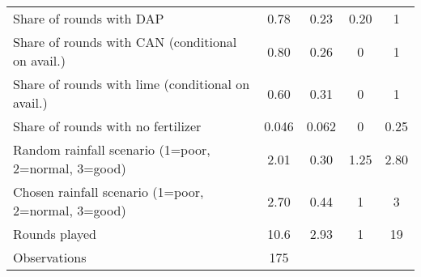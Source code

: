 \begin{table}[htbp]
\begin{threeparttable}
\begin{tabular}{l cccc}
Share of rounds with DAP&        0.78&        0.23&        0.20&           1\\
Share of rounds with CAN (conditional on avail.)&        0.80&        0.26&           0&           1\\
Share of rounds with lime (conditional on avail.)&        0.60&        0.31&           0&           1\\
Share of rounds with no fertilizer&       0.046&       0.062&           0&        0.25\\
Random rainfall scenario (1=poor, 2=normal, 3=good)&        2.01&        0.30&        1.25&        2.80\\
Chosen rainfall scenario (1=poor, 2=normal, 3=good)&        2.70&        0.44&           1&           3\\
Rounds played       &        10.6&        2.93&           1&          19\\
\hline
Observations        &         175&            &            &            \\
\hline
\hline
\end{tabular}
\end{threeparttable}
\end{table}
